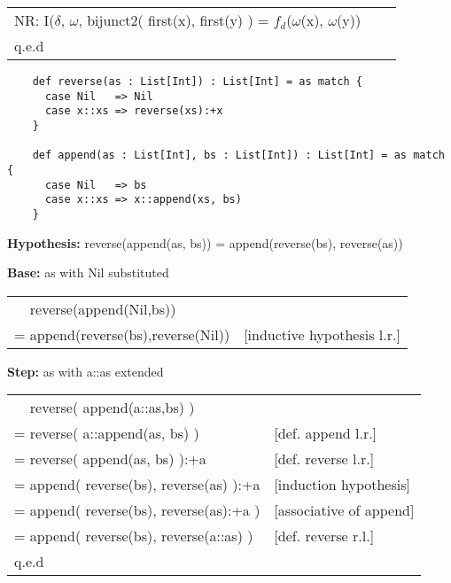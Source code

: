 \documentclass[10pt, a4paper]{article}
\begin{document}
\begin{description}
\begin{tabular}{ l l l }
        \noindent\hspace*{8mm} NR: I($\delta$, $\omega$, bijunct2( first(x), first(y) ) = $f_d$($\omega$(x),
        $\omega$(y)) \\

            q.e.d
        \end{tabular} 
        
    \end{description}


    \begin{verbatim}
    def reverse(as : List[Int]) : List[Int] = as match {
      case Nil   => Nil
      case x::xs => reverse(xs):+x
    }

    def append(as : List[Int], bs : List[Int]) : List[Int] = as match {
      case Nil   => bs
      case x::xs => x::append(xs, bs)
    }
    \end{verbatim}
    

    \begin{description} 
        \item \textbf{Hypothesis:} reverse(append(as, bs)) = append(reverse(bs), reverse(as))            
        \item \textbf{Base:} as with Nil substituted \\
            \begin{tabular}{ l l }
                \textcolor{white}{=} reverse(append(Nil,bs))   & \\
                = append(reverse(bs),reverse(Nil))             & [inductive hypothesis l.r.]
            \end{tabular}
        \item \textbf{Step:} as with a::as extended \\
            \begin{tabular}{ l l }
                \textcolor{white}{=} reverse( append(a::as,bs) )        &                        \\
                = reverse( a::append(as, bs) )                          & [def. append l.r.]     \\
                = reverse( append(as, bs) ):+a                          & [def. reverse l.r.]    \\
                = append( reverse(bs), reverse(as) ):+a                 & [induction hypothesis] \\
                = append( reverse(bs), reverse(as):+a )                 & [associative of append]\\
                = append( reverse(bs), reverse(a::as) )                 & [def. reverse r.l.]    \\
                q.e.d
            \end{tabular} 
    \end{description}
    
\end{document}
